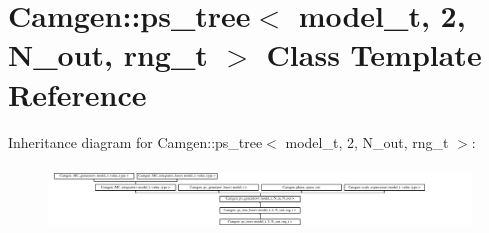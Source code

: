 \hypertarget{a00457}{}\section{Camgen\+:\+:ps\+\_\+tree$<$ model\+\_\+t, 2, N\+\_\+out, rng\+\_\+t $>$ Class Template Reference}
\label{a00457}
Inheritance diagram for Camgen\+:\+:ps\+\_\+tree$<$ model\+\_\+t, 2, N\+\_\+out, rng\+\_\+t $>$\+:\begin{figure}[H]
\begin{center}
\leavevmode
\includegraphics[height=1.739130cm]{a00457}
\end{center}
\end{figure}
